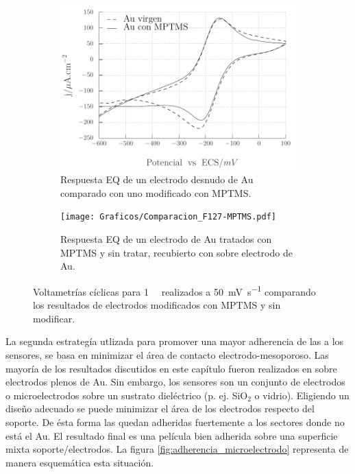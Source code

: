 		 			\begin{figure}[th]
			 	   	    \begin{subfigure}[t]{0.49\textwidth}
				        	\includegraphics[width=\textwidth]{Graficos/Comparacion_Au-MPTMS.pdf}
				       		\caption{Respuesta EQ de un electrodo desnudo de Au comparado con uno modificado con MPTMS.}	
				       		\end{subfigure}
						\begin{subfigure}[t]{0.49\textwidth}
				 	   	    \texttt{[image: Graficos/Comparacion\_F127-MPTMS.pdf]}
				       		\caption{Respuesta EQ de un electrodo de Au tratados con MPTMS y sin tratar, recubierto con \pdmF\space sobre electrodo de Au.}
				       		\end{subfigure}
						 	\caption[Comparación de superficies con y sin MPTMS.]{Voltametrías cíclicas para \aminorutenio\space \SI{1}{\milli\Molar} realizados a \SI{50}{\milli\volt.\second^{-1}} comparando los resultados de electrodos modificados con MPTMS y sin modificar.}
						 \label{fig:comparaciones_MPTMS}	
					     \end{figure}
			
			La segunda estrategía utlizada para promover una mayor adherencia de las \pdm\space a los sensores, se basa en minimizar el área de contacto electrodo-mesoporoso. Las mayoría de los resultados discutidos en este capítulo fueron realizados en \pdm\space sobre electrodos plenos de Au. Sin embargo, los sensores son un conjunto de electrodos o microelectrodos sobre un sustrato dieléctrico (p. ej. SiO$_2$ o vidrio). Eligiendo un diseño adecuado se puede minimizar el área de los electrodos respecto del soporte. De ésta forma las \pdm\space quedan adheridas fuertemente a los sectores donde no está el Au. El resultado final es una película bien adherida sobre una superficie mixta soporte/electrodos.  La figura \ref{fig:adherencia_microelectrodo} representa de manera esquemática esta situación.
			
